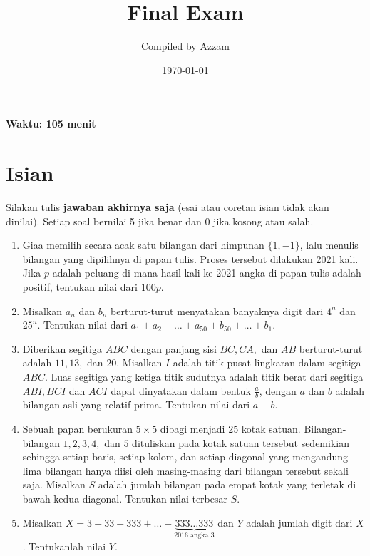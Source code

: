 \documentclass[11pt]{scrartcl}
\title{Final Exam}
\author{Compiled by Azzam}
\date{\today}
\begin{document}
\maketitle
\textbf{Waktu: 105 menit}

\section{Isian}
Silakan tulis \textbf{jawaban akhirnya saja} (esai atau coretan isian tidak akan dinilai). Setiap soal bernilai 5 jika benar dan 0 jika kosong atau salah.
\begin{enumerate}[resume]
    \item Giaa memilih secara acak satu bilangan dari himpunan $\{1,-1\}$, lalu menulis bilangan yang dipilihnya di papan tulis. Proses tersebut dilakukan 2021 kali. Jika $p$ adalah peluang di mana hasil kali ke-2021 angka di papan tulis adalah positif, tentukan nilai dari $100p$.
	
	
    \item Misalkan $a_n$ dan $b_n$ berturut-turut menyatakan banyaknya digit dari $4^n$ dan $25^n$. Tentukan nilai dari $a_1+a_2+\dots +a_{50}+b_{50}+\dots+b_1$.
	
	
    \item Diberikan segitiga $ABC$ dengan panjang sisi $BC,CA,$ dan $AB$ berturut-turut adalah $11,13,$ dan $20$. Misalkan $I$ adalah titik pusat lingkaran dalam segitiga $ABC$. Luas segitiga yang ketiga titik sudutnya adalah titik berat dari segitiga $ABI,BCI$ dan $ACI$ dapat dinyatakan dalam bentuk $\frac{a}{b}$, dengan $a$ dan $b$ adalah bilangan asli yang relatif prima. Tentukan nilai dari $a+b$.
	
    \item Sebuah papan berukuran $5 \times 5$ dibagi menjadi 25 kotak satuan. Bilangan-bilangan $1,2,3,4,$ dan $5$ dituliskan pada kotak satuan tersebut sedemikian sehingga setiap baris, setiap kolom, dan setiap diagonal yang mengandung lima bilangan hanya diisi oleh masing-masing dari bilangan tersebut sekali saja. Misalkan $S$ adalah jumlah bilangan pada empat kotak yang terletak di bawah kedua diagonal. Tentukan nilai terbesar $S$.
	
    \item Misalkan $X = 3 + 33 + 333 + \dots + \underbrace{333 \dots 333}_{2016 \text{ angka } 3}$ dan $Y$ adalah jumlah digit dari $X$. Tentukanlah nilai $Y$.
	
\end{enumerate}
\end{document}

